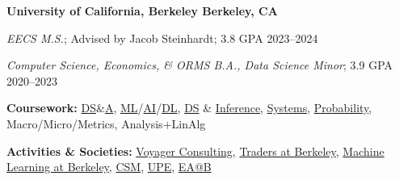 \textbf{University of California, Berkeley \hfill Berkeley, CA} \par
\textit{EECS M.S.}; Advised by Jacob Steinhardt; 3.8 GPA \hfill 2023--2024\par
\textit{Computer Science, Economics, \& ORMS B.A., Data Science Minor}; 3.9 GPA \hfill 2020--2023\par
\textbf{Coursework:} \href{https://sp23.datastructur.es/}{DS}\&\href{https://cs170.org/}{A}, \href{https://www.eecs189.org/}{ML}/\href{https://inst.eecs.berkeley.edu/~cs188/fa22/}{AI}/\href{https://inst.eecs.berkeley.edu/~cs182/sp23/}{DL}, \href{https://ds100.org/}{DS} \& \href{https://data102.org/fa22/}{Inference}, \href{https://inst.eecs.berkeley.edu/~cs61c/fa22/}{Systems}, \href{https://www.stat134.org/}{Probability}, Macro/Micro/Metrics, Analysis+LinAlg \par
\textbf{Activities \& Societies:} \href{https://www.voyagerconsulting.org/}{Voyager Consulting}, \href{https://traders.berkeley.edu/}{Traders at Berkeley}, \href{https://ml.berkeley.edu/}{Machine Learning at Berkeley}, \href{https://csmentors.berkeley.edu/#/}{CSM}, \href{https://upe.berkeley.edu/}{UPE}, \href{https://eaberkeley.com/}{EA@B}
